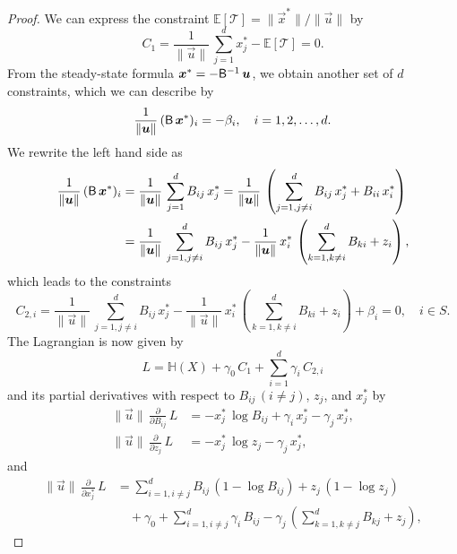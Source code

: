 \documentclass[smallextended]{svjour3}
\newcommand{\E}{\mathbb{E}}
\newcommand{\TT}{\mathcal{T}}
\renewcommand{\H}{\mathbb{H}}
\newcommand{\suml}{\sum\limits}
\newcommand{\pderiv}[1]{\frac{\partial}{\partial #1}}
\newcommand{\vnorms}[1]{\|#1\|}
\begin{document}
	\begin{proof}%
		We can express the constraint $\E\left[\TT\right] =\vnorms{\vec{x}^\ast}/\vnorms{\vec{u}}$ by
		\begin{equation*}
		C_1 = \frac{1}{\vnorms{\vec{u}}}\,\suml_{j=1}^d x_j^\ast - \E\left[\TT\right] = 0.
		\end{equation*}
		From the steady-state formula $\vec{x}^\ast = -\tens{B}^{-1}\,\vec{u}$, we obtain another set of $d$ constraints, which we can describe by
		\begin{equation*}
			\frac{1}{\vnorms{\vec{u}}}\,(\tens{B}\,\vec{x}^\ast)_i=-\beta_i,\quad i=1,2,\ldots,d.
		\end{equation*}
		We rewrite the left hand side as
		\begin{align*}
			\frac{1}{\vnorms{\vec{u}}}\,(\tens{B}\,\vec{x}^\ast)_i &= \frac{1}{\vnorms{\vec{u}}}\,\suml_{j=1}^d B_{ij}\,x_j^\ast = \frac{1}{\vnorms{\vec{u}}}\,\left(\suml_{j=1,j\neq i}^d B_{ij}\,x_j^\ast + B_{ii}\,x_i^\ast\right)\\
			&= \frac{1}{\vnorms{\vec{u}}}\,\suml_{j=1,j\neq i}^d B_{ij}\,x_j^\ast-\frac{1}{\vnorms{\vec{u}}}\,x_i^\ast\,\left(\suml_{k=1,k\neq i}^d B_{ki} + z_i\right), 
		\end{align*}
		which leads to the constraints
		\begin{equation}\label{eqn:constraint_C2}
			C_{2,i} = \frac{1}{\vnorms{\vec{u}}}\,\suml_{j=1,j\neq i}^d B_{ij}\,x_j^\ast-\frac{1}{\vnorms{\vec{u}}}\,x_i^\ast\,\left(\suml_{k=1,k\neq i}^d B_{ki} + z_i\right) + \beta_i = 0,\quad i\in S.
		\end{equation}	
		The Lagrangian is now given by
		\begin{equation}\label{eqn:Lagrangian}
			L = \H(X) + \gamma_0\,C_1 + \suml_{i=1}^d \gamma_i\,C_{2,i}
		\end{equation}
		and its partial derivatives with respect to $B_{ij}\,(i\neq j)$, $z_j$, and $ x_j^\ast$ by
		\begin{align*}
			\vnorms{\vec{u}}\,\pderiv{B_{ij}}\,L &=  -x_j^\ast\,\log B_{ij} + \gamma_i\,x_j^\ast- \gamma_j\,x_j^\ast,\\
			\vnorms{\vec{u}}\,\pderiv{z_j}\,L &= -x_j^\ast\,\log z_j-\gamma_j\,x_j^\ast,
		\end{align*}
		and
		\begin{align*}
			\vnorms{\vec{u}}\,\pderiv{x_j^\ast}\,L &= \suml_{i=1,i\neq j}^d B_{ij}\,(1-\log B_{ij}) + z_j\,(1-\log z_j)\\
			&\quad+ \gamma_0 + \suml_{i=1,i\neq j}^d \gamma_i\,B_{ij} - \gamma_j\,\left(\suml_{k=1,k\neq j}^d B_{kj} + z_j\right), 

\end{align*}
\end{proof}
\end{document}
